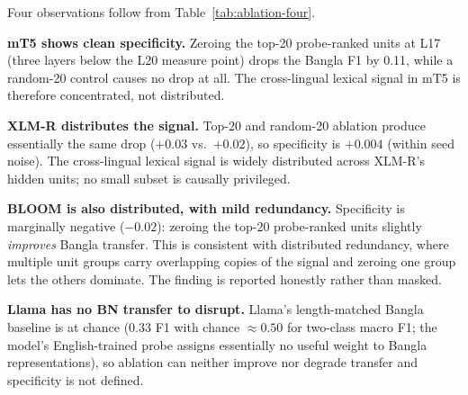 \begin{table}[H]
\centering
\caption{Causal forward-hook ablation on length-matched realword. mT5 alone shows selective localisation; XLM-R and BLOOM distribute lexical information; Llama has no BN transfer to disrupt.}
\label{tab:ablation-four}
\small
{}
\end{table}

Four observations follow from Table~\ref{tab:ablation-four}.

\textbf{mT5 shows clean specificity.} Zeroing the top-20 probe-ranked units at L17 (three layers below the L20 measure point) drops the Bangla F1 by 0.11, while a random-20 control causes no drop at all. The cross-lingual lexical signal in mT5 is therefore concentrated, not distributed.

\textbf{XLM-R distributes the signal.} Top-20 and random-20 ablation produce essentially the same drop ($+0.03$ vs.\ $+0.02$), so specificity is $+0.004$ (within seed noise). The cross-lingual lexical signal is widely distributed across XLM-R's hidden units; no small subset is causally privileged.

\textbf{BLOOM is also distributed, with mild redundancy.} Specificity is marginally negative ($-0.02$): zeroing the top-20 probe-ranked units slightly \emph{improves} Bangla transfer. This is consistent with distributed redundancy, where multiple unit groups carry overlapping copies of the signal and zeroing one group lets the others dominate. The finding is reported honestly rather than masked.

\textbf{Llama has no BN transfer to disrupt.} Llama's length-matched Bangla baseline is at chance (0.33 F1 with chance $\approx 0.50$ for two-class macro F1; the model's English-trained probe assigns essentially no useful weight to Bangla representations), so ablation can neither improve nor degrade transfer and specificity is not defined.

